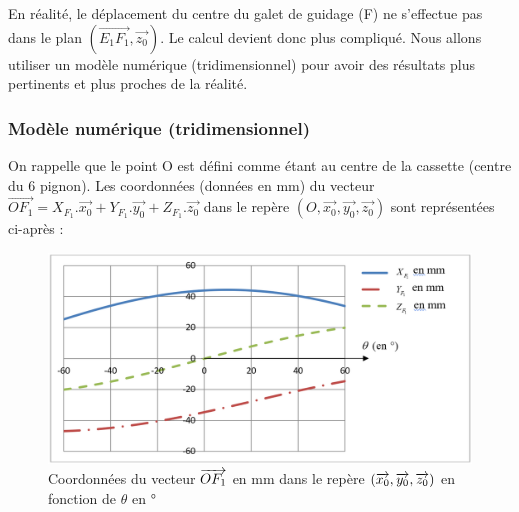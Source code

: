 %
%
%

En réalité, le déplacement du centre du galet de guidage (F) ne s'effectue pas dans le plan $(\overrightarrow{E_1F_1},\overrightarrow{z_0})$. Le calcul devient donc plus compliqué. Nous allons utiliser un modèle numérique (tridimensionnel) pour avoir des résultats plus pertinents et plus proches de la réalité.

\subsubsection{Modèle numérique (tridimensionnel)}

On rappelle que le point O est défini comme étant au centre de la cassette (centre du 6 pignon). Les coordonnées (données en mm) du vecteur $\overrightarrow{OF_1}=X_{F_1}.\overrightarrow{x_0}+Y_{F_1}.\overrightarrow{y_0}+Z_{F_1}.\overrightarrow{z_0}$
dans le repère $(O,\overrightarrow{x_0},\overrightarrow{y_0},\overrightarrow{z_0})$ sont représentées ci-après :

\begin{figure}[!h]
 \centering\includegraphics[width=0.8\linewidth]{img/img06}
 \caption{Coordonnées du vecteur $\protect\overrightarrow{OF_1}$ en mm dans le repère $(\protect\overrightarrow{x_0},\protect\overrightarrow{y_0},\protect\overrightarrow{z_0})$ en fonction de $\theta$ en °}
 \label{img06}
\end{figure}

